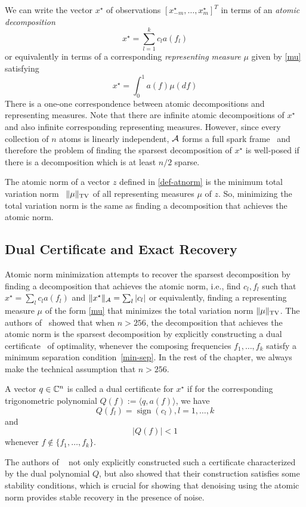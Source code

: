 We can write the vector $x^\star$ of observations $[x_{-m}^\star, \ldots, x_m^\star]^T$ in terms of an \emph{atomic decomposition}
\[
x^\star = \sum_{l=1}^k c_l a(f_l)
\]
or equivalently in terms of a corresponding \emph{representing measure} $\mu$ given by \eqref{mu} satisfying
\[
x^\star = \int_0^1 a(f) \mu(df)
\]
There is a one-one correspondence between atomic decompositions and representing measures. Note that there are infinite atomic decompositions of $x^\star$ and also infinite corresponding representing measures. However, since every collection of $n$ atoms is linearly independent, $\mathcal{A}$ forms a full spark frame~\cite{spark} and therefore the problem of finding the sparsest decomposition of $x^\star$ is well-posed if there is a decomposition which is at least $n/2$ sparse.

The atomic norm of a vector $z$ defined in \eqref{def-atnorm} is the minimum total variation norm~\cite{cs_otg,tvnorm} $\lVert\mu\rVert_{\mathrm{TV}}$ of all representing measures $\mu$ of $z$. So, minimizing the total variation norm is the same as finding a decomposition that achieves the atomic norm.

\subsection{Dual Certificate and Exact Recovery}

Atomic norm minimization attempts to recover the sparsest decomposition by
finding a decomposition that achieves the atomic norm, i.e., find ${c_l,f_l}$
such that $x^\star = \sum_l c_l a(f_l)$ and $ \lVert x^\star\rVert_{\mathcal{A}} = \sum_l |c_l|
$ or equivalently, finding a representing measure $\mu$ of the form \eqref{mu}
that minimizes the total variation norm $ \lVert\mu\rVert_{\mathrm{TV}}$. The
authors of~\cite{cg_exact12} showed that when $n > 256$, the decomposition that
achieves the atomic norm is the sparsest decomposition by explicitly
constructing a dual certificate~\cite{dualcert} of optimality, whenever the
composing frequencies $f_1, \ldots, f_k$ satisfy a minimum separation
condition~\eqref{min-sep}. In the rest of the chapter, we always make the
technical assumption that $n > 256$.

\begin{definition}
\label{dual-cert}
A vector $q \in \mathbb{C}^n$ is called a dual certificate for $x^\star$ if for the corresponding trigonometric polynomial $Q(f) := \langle q, a(f) \rangle$, we have
$$Q(f_l) = \operatorname{sign}(c_l), l = 1, \ldots, k$$  and $$|Q(f)| < 1$$ whenever $f\not\in \{ f_1, \ldots, f_k\}$.
\end{definition}
The authors of ~\cite{cg_exact12} not only explicitly constructed 
such a certificate characterized by the dual polynomial $Q$, but also showed that their construction satisfies some stability conditions, which is crucial for showing that denoising using the atomic norm provides stable recovery in the presence of noise.

